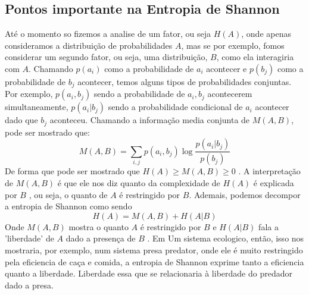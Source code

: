 \subsection{Pontos importante na Entropia de Shannon}
Até o momento so fizemos a analise de um fator, ou seja \(H(A)\), onde apenas consideramos a
distribuição de probabilidades \(A\), mas se por exemplo, fomos considerar um segundo fator, ou
seja, uma distribuição, \(B\), como ela interagiria com \(A\). Chamando \(p(a_i)\) como a
probabilidade de \(a_i\) acontecer e \(p(b_j)\) como a probabilidade de \(b_j\) acontecer, temos
alguns tipos de probabilidades conjuntas. Por exemplo, \(p(a_i,b_j)\) sendo a probabilidade de
\(a_i,b_j\) acontecerem simultaneamente, \(p(a_i|b_j)\) sendo a probabilidade condicional de \(a_i\)
acontecer dado que \(b_j\) aconteceu. Chamando a informação media conjunta de \(M(A,B)\), pode
ser mostrado que:
\begin{equation}
    M(A,B)=\sum_{i,j} p(a_i,b_j)\log \frac{p(a_i|b_j)}{p(b_j)}
\end{equation}
De forma que pode ser mostrado que \(H(A)\geq M(A,B)\geq 0\) . A interpretação de \(M(A,B)\) é que
ele nos diz quanto da complexidade de \(H(A)\) é explicada por \(B\) , ou seja, o quanto de \(A\) é
restringido por \(B\). Ademais, podemos decompor a entropia de Shannon como sendo
\begin{equation}\label{eq:entropia de shannon decomposta}
    H(A)=M(A,B)+H(A|B)
\end{equation}
Onde \(M(A,B)\) mostra o quanto \(A\) é restringido por \(B\) e \(H(A|B)\) fala a 'liberdade' de
\(A\) dado a presença de \(B\) . Em Um sistema ecologico, então, isso nos mostraria, por exemplo,
num sistema presa predator, onde ele é muito restringido pela eficiencia de caça e comida, a
entropia de Shannon exprime tanto a eficiencia quanto a liberdade. Liberdade essa que se
relacionaria à liberdade do predador dado a presa.